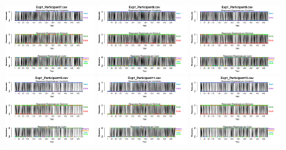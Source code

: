 \begin{itemize}
\begin{figure}[th]
\includegraphics[width=0.30\textwidth]{Figures/BiasResp_Exp1_P7} \includegraphics[width=0.30\textwidth]{Figures/BiasResp_Exp1_P8} \includegraphics[width=0.30\textwidth]{Figures/BiasResp_Exp1_P9}
\includegraphics[width=0.30\textwidth]{Figures/BiasResp_Exp1_P10} \includegraphics[width=0.30\textwidth]{Figures/BiasResp_Exp1_P11} \includegraphics[width=0.30\textwidth]{Figures/BiasResp_Exp1_P12}

\end{figure}
\end{itemize}
